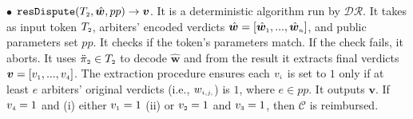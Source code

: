 \begin{definition}
%
\vspace{2mm}
\item  [$\bullet$] $\mathtt{resDispute}(T_{\scriptscriptstyle2}, \hat {\bm w}, pp)\rightarrow {\bm v}$. It is a deterministic algorithm run by $\mathcal {DR}$. It takes as input token $T_{\scriptscriptstyle 2}$,   arbiters' encoded verdicts  $\hat{ \bm{w}}=[\hat{\bm{w}}_{\scriptscriptstyle 1},..., \hat{\bm{w}}_{\scriptscriptstyle n}]$, and  public parameters set $pp$. It checks if the token's parameters match. If the check fails, it aborts. It uses $\ddot \pi_{\scriptscriptstyle 2}\in T_{\scriptscriptstyle 2}$  to decode $\hat {\bm w}$ and from the result it extracts final verdicts $\bm v= [v_{\scriptscriptstyle 1},...,v_{\scriptscriptstyle 4}]$.  The extraction procedure ensures each $v_{\scriptscriptstyle i}$ is set to $1$ only if at least  $e$ arbiters' original verdicts (i.e., $w_{\scriptscriptstyle i,j,}$) is $1$, where $e\in pp$.  It outputs $\bm v$. If $v_{\scriptscriptstyle 4}=1$ and (i) either $v_{\scriptscriptstyle 1}=1$ (ii) or $v_{\scriptscriptstyle 2}=1$ and $v_{\scriptscriptstyle 3}=1$, then  $\mathcal C$  is reimbursed.
\end{definition}



%





